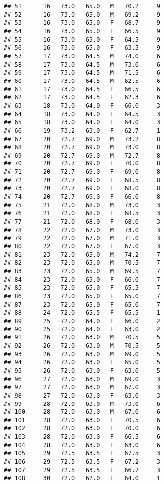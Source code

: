 \documentclass[
]{article}
\begin{document}
\begin{verbatim}
## 51      16   73.0   65.0   M   70.2     9
## 52      16   73.0   65.0   M   69.2     9
## 53      16   73.0   65.0   F   68.7     9
## 54      16   73.0   65.0   F   66.5     9
## 55      16   73.0   65.0   F   64.5     9
## 56      16   73.0   65.0   F   63.5     9
## 57      17   73.0   64.5   M   74.0     6
## 58      17   73.0   64.5   M   73.0     6
## 59      17   73.0   64.5   M   71.5     6
## 60      17   73.0   64.5   M   62.5     6
## 61      17   73.0   64.5   F   66.5     6
## 62      17   73.0   64.5   F   62.3     6
## 63      18   73.0   64.0   F   66.0     3
## 64      18   73.0   64.0   F   64.5     3
## 65      18   73.0   64.0   F   64.0     3
## 66      19   73.2   63.0   F   62.7     1
## 67      20   72.7   69.0   M   73.2     8
## 68      20   72.7   69.0   M   73.0     8
## 69      20   72.7   69.0   M   72.7     8
## 70      20   72.7   69.0   F   70.0     8
## 71      20   72.7   69.0   F   69.0     8
## 72      20   72.7   69.0   F   68.5     8
## 73      20   72.7   69.0   F   68.0     8
## 74      20   72.7   69.0   F   66.0     8
## 75      21   72.0   68.0   M   73.0     3
## 76      21   72.0   68.0   F   68.5     3
## 77      21   72.0   68.0   F   68.0     3
## 78      22   72.0   67.0   M   73.0     3
## 79      22   72.0   67.0   M   71.0     3
## 80      22   72.0   67.0   F   67.0     3
## 81      23   72.0   65.0   M   74.2     7
## 82      23   72.0   65.0   M   70.5     7
## 83      23   72.0   65.0   M   69.5     7
## 84      23   72.0   65.0   F   66.0     7
## 85      23   72.0   65.0   F   65.5     7
## 86      23   72.0   65.0   F   65.0     7
## 87      23   72.0   65.0   F   65.0     7
## 88      24   72.0   65.5   F   65.5     1
## 89      25   72.0   64.0   F   66.0     2
## 90      25   72.0   64.0   F   63.0     2
## 91      26   72.0   63.0   M   70.5     5
## 92      26   72.0   63.0   M   70.5     5
## 93      26   72.0   63.0   M   69.0     5
## 94      26   72.0   63.0   F   65.0     5
## 95      26   72.0   63.0   F   63.0     5
## 96      27   72.0   63.0   M   69.0     3
## 97      27   72.0   63.0   M   67.0     3
## 98      27   72.0   63.0   F   63.0     3
## 99      28   72.0   63.0   M   73.0     6
## 100     28   72.0   63.0   M   67.0     6
## 101     28   72.0   63.0   F   70.5     6
## 102     28   72.0   63.0   F   70.0     6
## 103     28   72.0   63.0   F   66.5     6
## 104     28   72.0   63.0   F   63.0     6
## 105     29   72.5   63.5   F   67.5     3
## 106     29   72.5   63.5   F   67.2     3
## 107     29   72.5   63.5   F   66.7     3
## 108     30   72.0   62.0   F   64.0     1

\end{verbatim}
\end{document}
